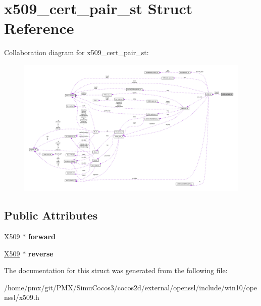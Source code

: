 \hypertarget{structx509__cert__pair__st}{}\section{x509\+\_\+cert\+\_\+pair\+\_\+st Struct Reference}
\label{structx509__cert__pair__st}


Collaboration diagram for x509\+\_\+cert\+\_\+pair\+\_\+st\+:
\nopagebreak
\begin{figure}[H]
\begin{center}
\leavevmode
\includegraphics[width=350pt]{structx509__cert__pair__st__coll__graph}
\end{center}
\end{figure}
\subsection*{Public Attributes}
\begin{DoxyCompactItemize}
\item 
\mbox{\label{structx509__cert__pair__st_a6187bc9b7943e8089be772b2657cfc65}} 
\hyperlink{structx509__st}{X509} $\ast$ {\bfseries forward}
\item 
\mbox{\label{structx509__cert__pair__st_acf854c09163ea3c9a79890aa13dee3bd}} 
\hyperlink{structx509__st}{X509} $\ast$ {\bfseries reverse}
\end{DoxyCompactItemize}


The documentation for this struct was generated from the following file\+:\begin{DoxyCompactItemize}
\item 
/home/pmx/git/\+P\+M\+X/\+Simu\+Cocos3/cocos2d/external/openssl/include/win10/openssl/x509.\+h\end{DoxyCompactItemize}

